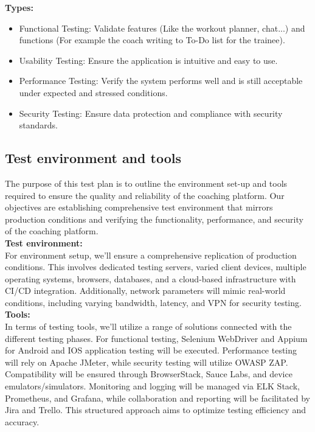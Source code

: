\textbf{Types:}\\
\begin{itemize}
    \item Functional Testing: Validate features (Like the workout planner, chat...) and functions (For example the coach writing to To-Do list for the trainee).
    \item Usability Testing: Ensure the application is intuitive and easy to use.
    \item Performance Testing: Verify the system performs well and is still acceptable under expected and stressed conditions.
    \item Security Testing: Ensure data protection and compliance with security standards.
\end{itemize}

\subsection{Test environment and tools}
The purpose of this test plan is to outline the environment set-up and tools required to ensure the quality and reliability of the coaching platform. Our objectives are establishing comprehensive test environment that mirrors production conditions and verifying the functionality, performance, and security of the coaching platform.\\

\textbf{Test environment:}\\
For environment setup, we'll ensure a comprehensive replication of production conditions. This involves dedicated testing servers, varied client devices, multiple operating systems, browsers, databases, and a cloud-based infrastructure with CI/CD integration. Additionally, network parameters will mimic real-world conditions, including varying bandwidth, latency, and VPN for security testing.\\

\textbf{Tools:}\\
In terms of testing tools, we'll utilize a range of solutions connected with the different testing phases. For functional testing, Selenium WebDriver and Appium for Android and IOS application testing will be executed. Performance testing will rely on Apache JMeter, while security testing will utilize OWASP ZAP. Compatibility will be ensured through BrowserStack, Sauce Labs, and device emulators/simulators. Monitoring and logging will be managed via ELK Stack, Prometheus, and Grafana, while collaboration and reporting will be facilitated by Jira and Trello. This structured approach aims to optimize testing efficiency and accuracy.

